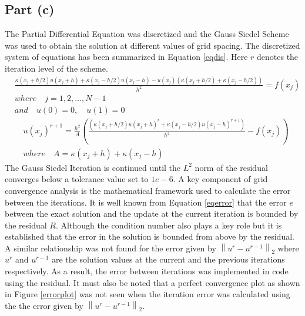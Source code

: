 \documentclass[12pt,dvipsnames]{article}
\newcommand\norm[1]{\left\lVert#1\right\rVert}
\newcommand{\an}[1]{{\leavevmode\color{BrickRed}{#1}}}
\begin{document}
\subsection{Part (c)}
The Partial Differential Equation was discretized and the Gauss Siedel Scheme was used to obtain the solution at different values of grid spacing. \an{It's fine to use Gauss-Seidel, but it's not really needed here; the problem sizes should be small enough that you don't have to use iterative methods. Anyway, you never really write down directly what linear system you're solving; this should be done for clarity.} The discretized system of equations has been summarized in Equation \ref{eqdis}. Here $r$ denotes the iteration level of the scheme.
\begin{equation} \label{eqdis}
    \begin{aligned}
        & \frac{\kappa( x_j + h/2 ) u(x_j + h) + \kappa( x_j - h/2 )u( x_j - h ) - u(x_j)( \kappa(x_j + h/2) + \kappa(x_j - h/2) )}{h^2} = f(x_j) \\
        & where \quad j = 1, 2, \ldots, N - 1 \\
        & and \quad u(0) = 0, \quad u(1) = 0
    \end{aligned}
\end{equation}
\begin{equation} \label{eqdis}
    \begin{aligned}
        & u(x_j)^{r + 1} = \frac{h^2}{A} \left( \frac{ \left( \kappa(x_j + h/2)u(x_j + h)^{r} + \kappa(x_j - h/2) u(x_j - h)^{r + 1} \right)}{h^2} - f(x_j) \right) \\
        & where \quad A = \kappa(x_j + h) + \kappa(x_j - h)
    \end{aligned}
\end{equation}
The Gauss Siedel Iteration is continued until the $L^2$ norm of the residual converges below a tolerance value set to $1e-6$. A key component of grid convergence analysis is the mathematical framework used to calculate the error between the iterations. It is well known from Equation \ref{eqerror} that the error $e$ between the exact solution and the update at the current iteration is bounded by the residual $R$. Although the condition number also plays a key role but it is established that the error in the solution is bounded from above by the residual. A similar relationship was not found for the error given by $\norm{u^{r} - u^{r - 1}}_2$ where $u^r$ and $u^{r - 1}$ are the solution values at the current and the previous iterations respectively. As a result, the error between iterations was implemented in code using the residual. It must also be noted that a perfect convergence plot as shown in Figure \ref{errorplot} was not seen when the iteration error was calculated using the the error given by $\norm{u^{r} - u^{r - 1}}_2$.
\end{document}
